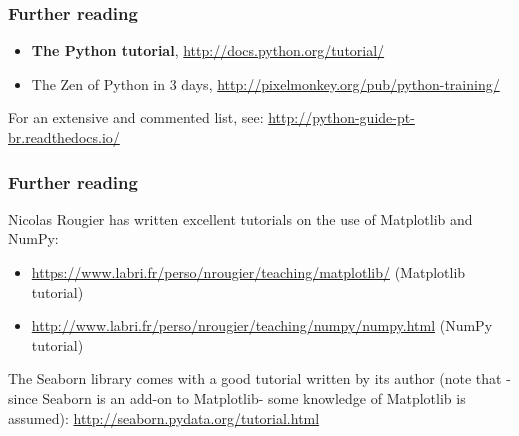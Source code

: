 \documentclass[english,serif,mathserif,xcolor=pdftex,dvipsnames,table]{beamer}
\begin{document}
\begin{frame}
  \frametitle{Further reading}

  \begin{itemize}
    \item \textbf{The Python tutorial},
      {\small \url{http://docs.python.org/tutorial/}}
    \item {The Zen of Python in 3 days},
      {\small \url{http://pixelmonkey.org/pub/python-training/}}
  \end{itemize}

  \+   For an extensive and commented list, see:
  {\url{http://python-guide-pt-br.readthedocs.io/}}
\end{frame}

\begin{frame}
  \frametitle{Further reading}

  Nicolas Rougier has written excellent tutorials on the use of Matplotlib and NumPy:
  \begin{itemize}
  \item
    \url{https://www.labri.fr/perso/nrougier/teaching/matplotlib/} (Matplotlib tutorial)
  \item
    \url{http://www.labri.fr/perso/nrougier/teaching/numpy/numpy.html} (NumPy tutorial)
  \end{itemize}

  \+
  The Seaborn library comes with a good tutorial written by its author (note
  that -since Seaborn is an add-on to Matplotlib- some knowledge of Matplotlib
  is assumed): \url{http://seaborn.pydata.org/tutorial.html}
\end{frame}





\end{document}
